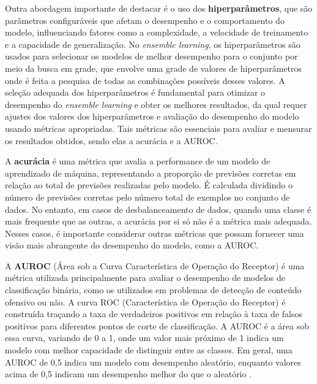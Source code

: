 Outra abordagem importante de destacar é o uso dos \textbf{hiperparâmetros}, que são parâmetros configuráveis que afetam o desempenho e o comportamento do modelo, influenciando fatores como a complexidade, a velocidade de treinamento e a capacidade de generalização. No \textit{ensemble learning}, os hiperparâmetros são usados para selecionar os modelos de melhor desempenho para o conjunto por meio da busca em grade, que envolve uma grade de valores de hiperparâmetros onde é feita a pesquisa de todas as combinações possíveis desses valores. A seleção adequada dos hiperparâmetros é fundamental para otimizar o desempenho do \textit{ensemble learning} e obter os melhores resultados, da qual requer ajustes dos valores dos hiperparâmetros e avaliação do desempenho do modelo usando métricas apropriadas. Tais métricas são essenciais para avaliar e mensurar os resultados obtidos, sendo elas a acurácia e a AUROC.

A \textbf{acurácia} é uma métrica que avalia a performance de um modelo de aprendizado de máquina, representando a proporção de previsões corretas em relação ao total de previsões realizadas pelo modelo. É calculada dividindo o número de previsões corretas pelo número total de exemplos no conjunto de dados. No entanto, em casos de desbalanceamento de dados, quando uma classe é mais frequente que as outras, a acurácia por si só não é a métrica mais adequada. Nesses casos, é importante considerar outras métricas que possam fornecer uma visão mais abrangente do desempenho do modelo, como a AUROC.

A \textbf{AUROC} (Área sob a Curva Característica de Operação do Receptor) é uma métrica utilizada principalmente para avaliar o desempenho de modelos de classificação binária, como os utilizados em problemas de detecção de conteúdo ofensivo ou não. A curva ROC (Característica de Operação do Receptor) é construída traçando a taxa de verdadeiros positivos em relação à taxa de falsos positivos para diferentes pontos de corte de classificação. A AUROC é a área sob essa curva, variando de 0 a 1, onde um valor mais próximo de 1 indica um modelo com melhor capacidade de distinguir entre as classes. Em geral, uma AUROC de 0,5 indica um modelo com desempenho aleatório, enquanto valores acima de 0,5 indicam um desempenho melhor do que o aleatório \cite{BradleyAUROC}.

